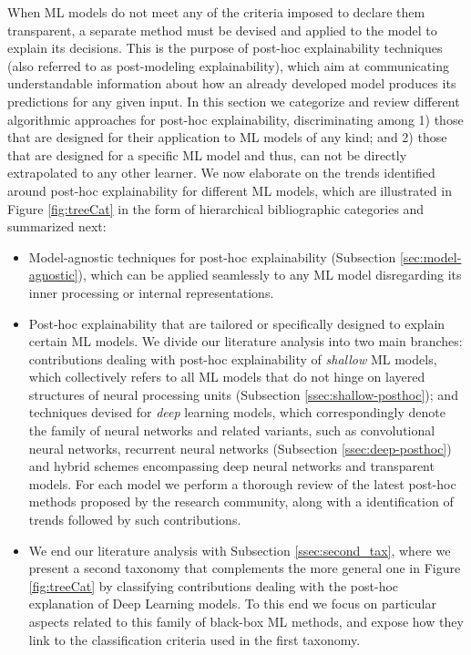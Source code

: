 \documentclass[final]{elsarticle}
\begin{document}
When ML models do not meet any of the criteria imposed to declare them transparent, a separate method must be devised and applied to the model to explain its decisions. This is the purpose of post-hoc explainability techniques (also referred to as post-modeling explainability), which aim at communicating understandable information about how an already developed model produces its predictions for any given input. In this section we categorize and review different algorithmic approaches for post-hoc explainability, discriminating among 1) those that are designed for their application to ML models of any kind; and 2) those that are designed for a specific ML model and thus, can not be directly extrapolated to any other learner. We now elaborate on the trends identified around post-hoc explainability for different ML models, which are illustrated in Figure \ref{fig:treeCat} in the form of hierarchical bibliographic categories and summarized next:
\begin{itemize}[leftmargin=*]
\item Model-agnostic techniques for post-hoc explainability (Subsection \ref{sec:model-agnostic}), which can be applied seamlessly to any ML model disregarding its inner processing or internal representations.
\item Post-hoc explainability that are tailored or specifically designed to explain certain ML models. We divide our literature analysis into two main branches: contributions dealing with post-hoc explainability of \emph{shallow} ML models, which collectively refers to all ML models that do not hinge on layered structures of neural processing units (Subsection \ref{ssec:shallow-posthoc}); and techniques devised for \emph{deep} learning models, which correspondingly denote the family of neural networks and related variants, such as convolutional neural networks, recurrent neural networks (Subsection \ref{ssec:deep-posthoc}) and hybrid schemes encompassing deep neural networks and transparent models. For each model we perform a thorough review of the latest post-hoc methods proposed by the research community, along with a identification of trends followed by such contributions.
\item We end our literature analysis with Subsection \ref{ssec:second_tax}, where we present a second taxonomy that complements the more general one in Figure \ref{fig:treeCat} by classifying contributions dealing with the post-hoc explanation of Deep Learning models. To this end we focus on particular aspects related to this family of black-box ML methods, and expose how they link to the classification criteria used in the first taxonomy. 
\end{itemize}
\end{document}
